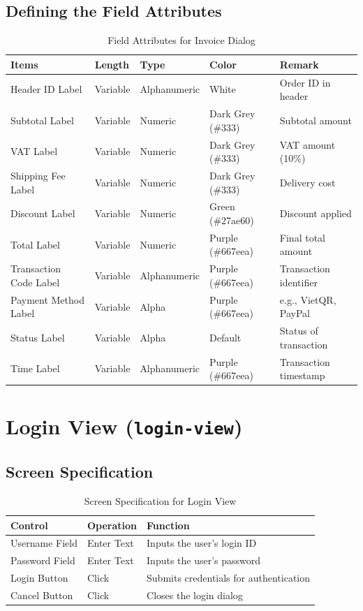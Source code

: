 \documentclass{article}
\begin{document}
\subsection{Defining the Field Attributes}
\begin{table}[h!]
\centering
\begin{tabularx}{\textwidth}{|l|l|l|l|X|}
\hline
\textbf{Items} & \textbf{Length} & \textbf{Type} & \textbf{Color} & \textbf{Remark} \\
\hline
Header ID Label & Variable & Alphanumeric & White & Order ID in header \\
\hline
Subtotal Label & Variable & Numeric & Dark Grey (\#333) & Subtotal amount \\
\hline
VAT Label & Variable & Numeric & Dark Grey (\#333) & VAT amount (10\%) \\
\hline
Shipping Fee Label & Variable & Numeric & Dark Grey (\#333) & Delivery cost \\
\hline
Discount Label & Variable & Numeric & Green (\#27ae60) & Discount applied \\
\hline
Total Label & Variable & Numeric & Purple (\#667eea) & Final total amount \\
\hline
Transaction Code Label & Variable & Alphanumeric & Purple (\#667eea) & Transaction identifier \\
\hline
Payment Method Label & Variable & Alpha & Purple (\#667eea) & e.g., VietQR, PayPal \\
\hline
Status Label & Variable & Alpha & Default & Status of transaction \\
\hline
Time Label & Variable & Alphanumeric & Purple (\#667eea) & Transaction timestamp \\
\hline
\end{tabularx}
\caption{Field Attributes for Invoice Dialog}
\end{table}

\section{Login View (\texttt{login-view})}
\subsection{Screen Specification}
\begin{table}[h!]
\centering
\begin{tabularx}{\textwidth}{|l|l|X|}
\hline
\textbf{Control} & \textbf{Operation} & \textbf{Function} \\
\hline
Username Field & Enter Text & Inputs the user's login ID \\
\hline
Password Field & Enter Text & Inputs the user's password \\
\hline
Login Button & Click & Submits credentials for authentication \\
\hline
Cancel Button & Click & Closes the login dialog \\
\hline
\end{tabularx}
\caption{Screen Specification for Login View}
\end{table}
\end{document}
